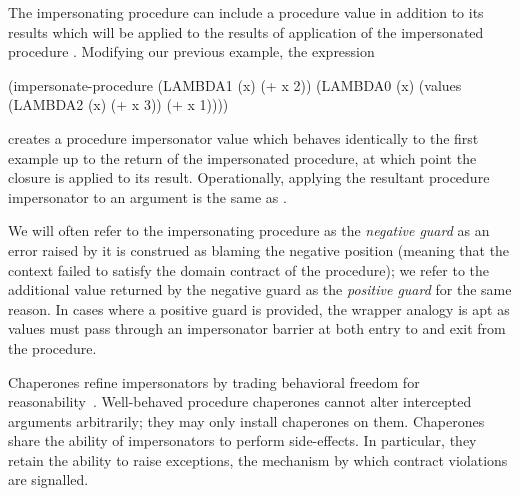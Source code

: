 \documentclass{sigplanconf}
\begin{document}
The impersonating procedure  can include a procedure value in addition to its results which will be applied to the results of application of the impersonated procedure .
Modifying our previous example, the expression
\begin{schemedisplay}
(impersonate-procedure (LAMBDA1 (x) (+ x 2))
                       (LAMBDA0 (x) (values (LAMBDA2 (x) (+ x 3)) (+ x 1))))
\end{schemedisplay}
creates a procedure impersonator value which behaves identically to the first example up to the return of the impersonated procedure, at which point the  closure is applied to its result.
Operationally, applying the resultant procedure impersonator to an argument  is the same as .

We will often refer to the impersonating procedure as the \emph{negative guard} as an error raised by it is construed as blaming the negative position (meaning that the context failed to satisfy the domain contract of the procedure); we refer to the additional value returned by the negative guard as the \emph{positive guard} for the same reason.
In cases where a positive guard is provided, the wrapper analogy is apt as values must pass through an impersonator barrier at both entry to and exit from the procedure.

Chaperones refine impersonators by trading behavioral freedom for reasonability~\cite{strickland2012chaperones}.
Well-behaved procedure chaperones cannot alter intercepted arguments arbitrarily; they may only install chaperones on them.
Chaperones share the ability of impersonators to perform side-effects.
In particular, they retain the ability to raise exceptions, the mechanism by which contract violations are signalled.
\end{document}

